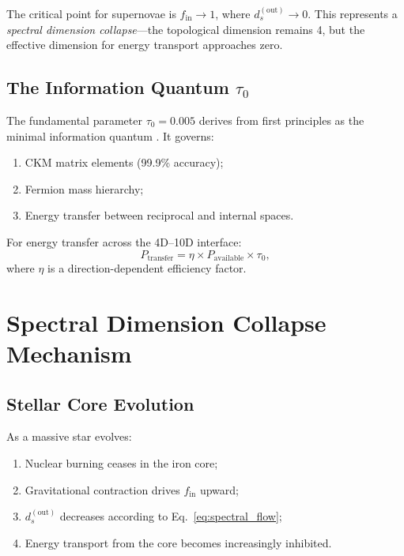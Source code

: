 \documentclass[twocolumn, tightenlines, showpacs, showkeys, nofootinbib]{revtex4-1}
\newcommand{\dout}{d_s^{(\text{out})}}
\newcommand{\tauzero}{\tau_0}
\begin{document}
The critical point for supernovae is $f_{\text{in}} \to 1$, where 
$\dout \to 0$. This represents a \emph{spectral dimension collapse}---the 
topological dimension remains 4, but the effective dimension for energy 
transport approaches zero.

\subsection{The Information Quantum $\tauzero$}

The fundamental parameter $\tauzero = 0.005$ derives from first 
principles as the minimal information quantum \citep{CTUFT2026}. It governs:
\begin{enumerate}
    \item CKM matrix elements (99.9\% accuracy);
    \item Fermion mass hierarchy;
    \item Energy transfer between reciprocal and internal spaces.
\end{enumerate}

For energy transfer across the 4D--10D interface:
\begin{equation}
    P_{\text{transfer}} = \eta \times P_{\text{available}} \times \tauzero,
\end{equation}
where $\eta$ is a direction-dependent efficiency factor.

\section{Spectral Dimension Collapse Mechanism}
\label{sec:mechanism}

\subsection{Stellar Core Evolution}

As a massive star evolves:
\begin{enumerate}
    \item Nuclear burning ceases in the iron core;
    \item Gravitational contraction drives $f_{\text{in}}$ upward;
    \item $\dout$ decreases according to Eq.~\eqref{eq:spectral_flow};
    \item Energy transport from the core becomes increasingly inhibited.
\end{enumerate}
\end{document}
